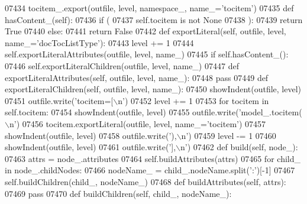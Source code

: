 \begin{DoxyCode}
{{{{{{{{{{{{{{{{{{{{{{{{{{{{{{{{{{{{{{{{{{{{{{{{{{{{{{{{{{{{{{{{{{{{{{{{{{{{{{{{{{{{{{{{{{{{{{{{{{{{{{{{{{{{{{{{{{{{{{{{{{{{{{{{{{{{{{{{{{{{{{{{{{{{{{{{{{{{{{{{{{{{{{{{{{{{{{{{{{{{{{{{{{{{{{{{{{{{{{{{{{{{{{{{{{{{{{{{{{{{{{{{{{{{{{{{{{{{{{{{{{{{{{{{{{{{{{{{{{{{{{{{{{{{{{{{{{{{{{{{{{{{{{{{{{{{{{{{{{{{{{{{{{{{{{{{{{{{{{{{{{{{{{{{{{{{{{{{{{{{{{{{{{{{{{{{{{{{{{{{{{{{{{{{{{{{{{{{{{{{{{{{{{{{{{{{{{{{{{{{{{{{{{{{{{{{{{{{{{{{{{{{{{{{{{{{{{{{{{{{{{{{{{{{{{{{{{{{{{{{{{{{{{{{{{07434             tocitem\_.export(outfile, level, namespace\_, name\_=\textcolor{stringliteral}{'tocitem'})
07435     \textcolor{keyword}{def }hasContent_(self):
07436         \textcolor{keywordflow}{if} (
07437             self.tocitem \textcolor{keywordflow}{is} \textcolor{keywordflow}{not} \textcolor{keywordtype}{None}
07438             ):
07439             \textcolor{keywordflow}{return} \textcolor{keyword}{True}
07440         \textcolor{keywordflow}{else}:
07441             \textcolor{keywordflow}{return} \textcolor{keyword}{False}
07442     \textcolor{keyword}{def }exportLiteral(self, outfile, level, name\_='docTocListType'):
07443         level += 1
07444         self.exportLiteralAttributes(outfile, level, name\_)
07445         \textcolor{keywordflow}{if} self.hasContent_():
07446             self.exportLiteralChildren(outfile, level, name\_)
07447     \textcolor{keyword}{def }exportLiteralAttributes(self, outfile, level, name\_):
07448         \textcolor{keywordflow}{pass}
07449     \textcolor{keyword}{def }exportLiteralChildren(self, outfile, level, name\_):
07450         showIndent(outfile, level)
07451         outfile.write(\textcolor{stringliteral}{'tocitem=[\(\backslash\)n'})
07452         level += 1
07453         \textcolor{keywordflow}{for} tocitem \textcolor{keywordflow}{in} self.tocitem:
07454             showIndent(outfile, level)
07455             outfile.write(\textcolor{stringliteral}{'model\_.tocitem(\(\backslash\)n'})
07456             tocitem.exportLiteral(outfile, level, name\_=\textcolor{stringliteral}{'tocitem'})
07457             showIndent(outfile, level)
07458             outfile.write(\textcolor{stringliteral}{'),\(\backslash\)n'})
07459         level -= 1
07460         showIndent(outfile, level)
07461         outfile.write(\textcolor{stringliteral}{'],\(\backslash\)n'})
07462     \textcolor{keyword}{def }build(self, node\_):
07463         attrs = node\_.attributes
07464         self.buildAttributes(attrs)
07465         \textcolor{keywordflow}{for} child\_ \textcolor{keywordflow}{in} node\_.childNodes:
07466             nodeName\_ = child\_.nodeName.split(\textcolor{stringliteral}{':'})[-1]
07467             self.buildChildren(child\_, nodeName\_)
07468     \textcolor{keyword}{def }buildAttributes(self, attrs):
07469         \textcolor{keywordflow}{pass}
07470     \textcolor{keyword}{def }buildChildren(self, child\_, nodeName\_):
}}}}}}}}}}}}}}}}}}}}}}}}}}}}}}}}}}}}}}}}}}}}}}}}}}}}}}}}}}}}}}}}}}}}}}}}}}}}}}}}}}}}}}}}}}}}}}}}}}}}}}}}}}}}}}}}}}}}}}}}}}}}}}}}}}}}}}}}}}}}}}}}}}}}}}}}}}}}}}}}}}}}}}}}}}}}}}}}}}}}}}}}}}}}}}}}}}}}}}}}}}}}}}}}}}}}}}}}}}}}}}}}}}}}}}}}}}}}}}}}}}}}}}}}}}}}}}}}}}}}}}}}}}}}}}}}}}}}}}}}}}}}}}}}}}}}}}}}}}}}}}}}}}}}}}}}}}}}}}}}}}}}}}}}}}}}}}}}}}}}}}}}}}}}}}}}}}}}}}}}}}}}}}}}}}}}}}}}}}}}}}}}}}}}}}}}}}}}}}}}}}}}}}}}}}}}}}}}}}}}}}}}}}}}}}}}}}}}}}}}}}}}}}}}}}}}}}}}}}}}}}}}}}}}}}
\end{DoxyCode}
